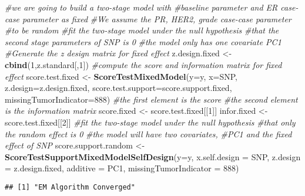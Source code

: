 \documentclass[11pt,]{article}
\newenvironment{Shaded}{\begin{snugshade}}{\end{snugshade}}
\newcommand{\CommentTok}[1]{\textcolor[rgb]{0.56,0.35,0.01}{\textit{#1}}}
\newcommand{\DataTypeTok}[1]{\textcolor[rgb]{0.13,0.29,0.53}{#1}}
\newcommand{\DecValTok}[1]{\textcolor[rgb]{0.00,0.00,0.81}{#1}}
\newcommand{\KeywordTok}[1]{\textcolor[rgb]{0.13,0.29,0.53}{\textbf{#1}}}
\newcommand{\NormalTok}[1]{#1}
\newcommand{\StringTok}[1]{\textcolor[rgb]{0.31,0.60,0.02}{#1}}
\begin{document}
\begin{Shaded}
\begin{Highlighting}[]
\CommentTok{#we are going to build a two-stage model with }
\CommentTok{#baseline parameter and ER case-case parameter as fixed}
\CommentTok{#We assume the PR, HER2, grade case-case parameter }
\CommentTok{#to be random}
\CommentTok{#fit the two-stage model under the null hypothesis}
\CommentTok{#that the second stage parameters of SNP is 0}
\CommentTok{#the model only has one covariate PC1}
\CommentTok{#Generate the z design matrix for fixed effect}
\NormalTok{z.design.fixed <-}\StringTok{ }\KeywordTok{cbind}\NormalTok{(}\DecValTok{1}\NormalTok{,z.standard[,}\DecValTok{1}\NormalTok{])}
\CommentTok{#compute the score and information matrix for fixed effect}
\NormalTok{score.test.fixed <-}\StringTok{ }\KeywordTok{ScoreTestMixedModel}\NormalTok{(}\DataTypeTok{y=}\NormalTok{y,}
                    \DataTypeTok{x=}\NormalTok{SNP,}
                    \DataTypeTok{z.design=}\NormalTok{z.design.fixed,}
                    \DataTypeTok{score.test.support=}\NormalTok{score.support.fixed,}
                    \DataTypeTok{missingTumorIndicator=}\DecValTok{888}\NormalTok{)}
\CommentTok{#the first element is the score}
\CommentTok{#the second element is the information matrix}
\NormalTok{score.fixed <-}\StringTok{ }\NormalTok{score.test.fixed[[}\DecValTok{1}\NormalTok{]]}
\NormalTok{infor.fixed <-}\StringTok{ }\NormalTok{score.test.fixed[[}\DecValTok{2}\NormalTok{]]}
\CommentTok{#fit the two-stage model under the null hypothesis}
\CommentTok{#that only the random effect is 0}
\CommentTok{#the model will have two covariates, }
\CommentTok{#PC1 and the fixed effect of SNP}
\NormalTok{score.support.random <-}\StringTok{ }\KeywordTok{ScoreTestSupportMixedModelSelfDesign}\NormalTok{(}\DataTypeTok{y=}\NormalTok{y,}
                        \DataTypeTok{x.self.design  =}\NormalTok{ SNP,}
                        \DataTypeTok{z.design =}\NormalTok{ z.design.fixed,}
                        \DataTypeTok{additive =}\NormalTok{ PC1,}
                        \DataTypeTok{missingTumorIndicator =} \DecValTok{888}\NormalTok{)}
\end{Highlighting}
\end{Shaded}

\begin{verbatim}
## [1] "EM Algorithm Converged"
\end{verbatim}
\end{document}
